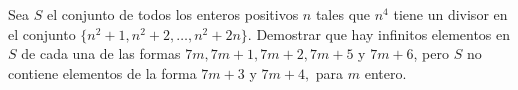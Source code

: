 Sea $S$ el conjunto de todos los enteros positivos $n$ tales que $n^4$ tiene un divisor en el
conjunto $\{n^2 + 1, n^2 + 2, \dots, n^2 + 2n\}$. Demostrar que hay infinitos elementos en $S$ de cada una de las
formas $7m, 7m + 1, 7m + 2, 7m + 5$ y $7m + 6$, pero $S$ no contiene elementos de la forma $7m + 3$ y
$7m + 4,$ para $m$ entero.